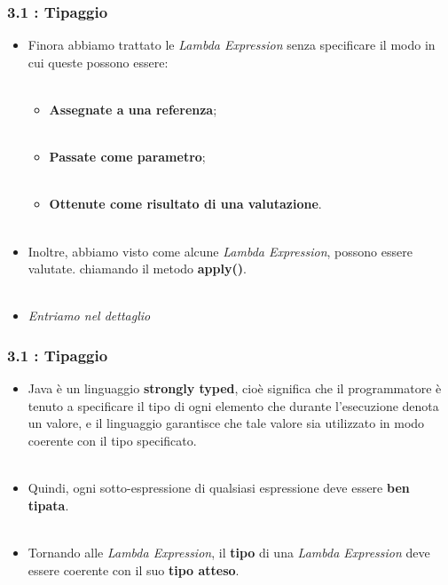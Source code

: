 \documentclass{beamer}
\begin{document}
\begin{frame}
	\frametitle{\textbf{3.1 : Tipaggio}}
	\begin{itemize}
		\item 
			Finora abbiamo trattato le \textit{Lambda Expression} senza specificare il modo in cui queste possono essere:\\\ 
			\begin{itemize}
				\item
					\textbf{Assegnate a una referenza};\\\
				\item
					\textbf{Passate come parametro};\\\
				\item
					\textbf{Ottenute come risultato di una valutazione}.\\\	
			\end{itemize}
		\item 
			Inoltre, abbiamo visto come alcune \textit{Lambda Expression}, possono essere valutate. chiamando il metodo \textbf{apply()}.\\\
		\item 
			\textit{Entriamo nel dettaglio}
	\end{itemize}
\end{frame}


\begin{frame}
	\frametitle{\textbf{3.1 : Tipaggio}}
	\begin{itemize}
		\item 
			Java è un linguaggio \textbf{strongly typed}, cioè significa che il programmatore è tenuto a specificare il tipo di ogni elemento che durante l'esecuzione denota un valore, e il linguaggio garantisce che tale valore sia utilizzato in modo coerente con il tipo specificato.\\\
		\item 
			Quindi, ogni sotto-espressione di qualsiasi espressione deve essere \textbf{ben tipata}.\\\
		\item 
			Tornando alle \textit{Lambda Expression}, il \textbf{tipo} di una \textit{Lambda Expression} deve essere coerente con il suo \textbf{tipo atteso}.
	\end{itemize}
\end{frame}

\end{document}
